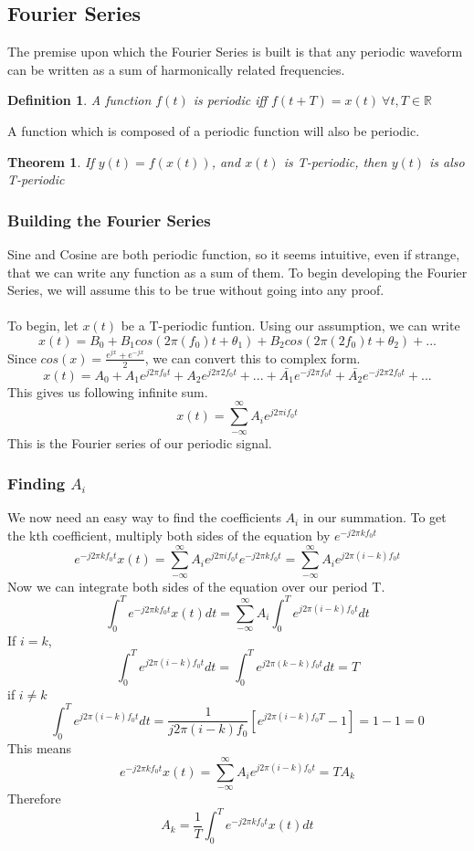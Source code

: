 \documentclass{article}
\newtheorem{theorem}{Theorem}
\newtheorem{definition}{Definition}
\begin{document}
\subsection{Fourier Series}
The premise upon which the Fourier Series is built is that any periodic waveform can be written
as a sum of harmonically related frequencies.
\begin{definition}
    A function $f(t)$ is periodic iff $f(t+T)=x(t)\ \forall t, T\in \mathbb{R}$
\end{definition}
A function which is composed of a periodic function will also be periodic.
\begin{theorem}
    If $y(t) = f(x(t))$, and $x(t)$ is T-periodic, then $y(t)$ is also T-periodic
\end{theorem}
\subsubsection{Building the Fourier Series}
Sine and Cosine are both periodic function, so it seems intuitive, even if strange,
that we can write any function as a sum of them. To begin developing the Fourier Series,
we will assume this to be true without going into any proof.\\\\
To begin, let $x(t)$ be a T-periodic funtion. Using our assumption, we can write
$$x(t) = B_0+B_1cos(2\pi(f_0)t+\theta_1)+B_2cos(2\pi(2f_0)t+\theta_2)+...$$
Since $cos(x) = \frac{e^{jx}+e^{-jx}}{2}$, we can convert this to complex form.
$$x(t) = A_0 + A_1e^{j2\pi f_0 t} + A_2e^{j2\pi 2f_0 t} + ... + \bar{A_1}e^{-j2\pi f_0 t} + \bar{A_2}e^{-j2\pi 2f_0 t} + ...$$
This gives us following infinite sum.
$$x(t) = \sum_{-\infty}^{\infty}{A_i e^{j2\pi i f_0 t}}$$
This is the Fourier series of our periodic signal.
\subsubsection{Finding $A_i$}
We now need an easy way to find the coefficients $A_i$ in our summation.
To get the kth coefficient, multiply both sides of the equation by $e^{-j2\pi k f_0t}$
$$e^{-j2\pi k f_0t} x(t) = \sum_{-\infty}^{\infty}{A_i e^{j2\pi i f_0 t} e^{-j2\pi k f_0t}} = \sum_{-\infty}^{\infty}{A_i e^{j2\pi (i-k) f_0 t}}$$
Now we can integrate both sides of the equation over our period T.
$$\int_{0}^{T}{e^{-j2\pi k f_0t} x(t)dt} = \sum_{-\infty}^{\infty}{A_i \int_{0}^{T}{e^{j2\pi (i-k) f_0 t}dt}}$$
If $i = k$,
$$\int_{0}^{T}{e^{j2\pi (i-k) f_0 t}dt} = \int_{0}^{T}{e^{j2\pi (k-k) f_0 t}dt} = T$$
if $i \ne k$
$$\int_{0}^{T}{e^{j2\pi (i-k) f_0 t}dt} = \frac{1}{j2\pi (i-k)f_0}\left[e^{j2\pi(i-k)f_0 T} - 1 \right] = 1 - 1 = 0$$
This means
$$e^{-j2\pi k f_0t} x(t) = \sum_{-\infty}^{\infty}{A_i e^{j2\pi (i-k) f_0 t}} = T A_k$$
Therefore
$$A_k = \frac{1}{T}\int_{0}^{T}{e^{-j2\pi k f_0t} x(t)dt}$$
\end{document}
